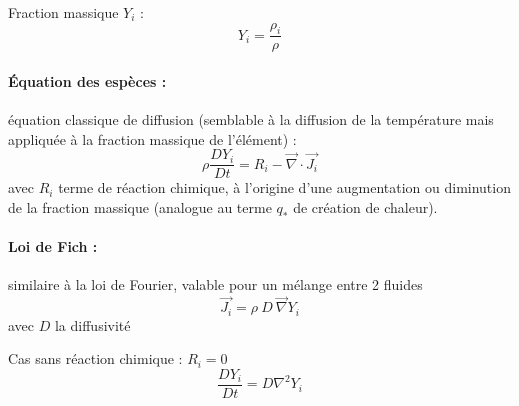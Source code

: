 Fraction massique $Y_i$ :
%
\begin{equation}
Y_i = \frac{\rho_i}{\rho}
\end{equation}

\paragraph{Équation des espèces :} équation classique de diffusion (semblable à la diffusion de la température mais appliquée à la fraction massique de l'élément) :
%
\begin{equation}
\rho \frac{DY_i}{Dt} = R_i - \vec{\nabla} \cdot \vec{J_i}
\end{equation}
%
avec $R_i$ terme de réaction chimique, à l'origine d'une augmentation ou diminution de la fraction massique (analogue au terme $q_*$ de création de chaleur).

\paragraph{Loi de Fich :}similaire à la loi de Fourier, valable pour un mélange entre 2 fluides
%
\begin{equation}
\vec{J_i} = \rho~D~\vec{\nabla} Y_i
\end{equation}
%
avec $D$ la diffusivité

Cas sans réaction chimique : $R_i=0$
%
\begin{equation}
\frac{DY_i}{Dt} = D \nabla^2 Y_i
\end{equation}
